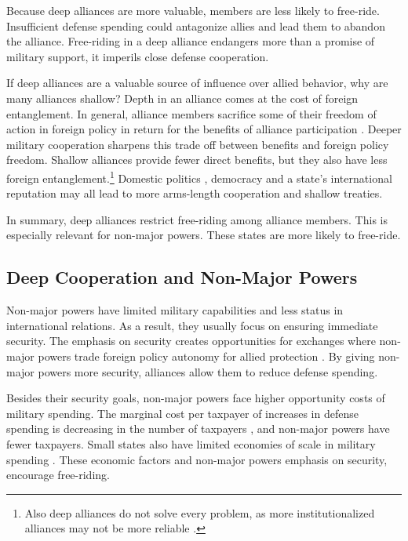 \documentclass[12pt]{article}
\begin{document}
Because deep alliances are more valuable, members are less likely to free-ride. 
Insufficient defense spending could antagonize allies and lead them to abandon the alliance. 
Free-riding in a deep alliance endangers more than a promise of military support, it imperils close defense cooperation. 


If deep alliances are a valuable source of influence over allied behavior, why are many alliances shallow? 
Depth in an alliance comes at the cost of foreign entanglement. 
In general, alliance members sacrifice some of their freedom of action in foreign policy in return for the benefits of alliance participation \citep{Altfield1984, Snyder1997}.
Deeper military cooperation sharpens this trade off between benefits and foreign policy freedom. 
Shallow alliances provide fewer direct benefits, but they also have less foreign entanglement.\footnote{Also deep alliances do not solve every problem, as more institutionalized alliances may not be more reliable \citep{LeedsAnac2005}.}
Domestic politics \citep{Davis2004}, democracy \citep{Chibaetal2015} and a state's international reputation \citep{Mattes2012} may all lead to more arms-length cooperation and shallow treaties. 


In summary, deep alliances restrict free-riding among alliance members. 
This is especially relevant for non-major powers.
These states are more likely to free-ride. 


\subsection{Deep Cooperation and Non-Major Powers} 


Non-major powers have limited military capabilities and less status in international relations. 
As a result, they usually focus on ensuring immediate security.  
The emphasis on security creates opportunities for exchanges where non-major powers trade foreign policy autonomy for allied protection \citep{Altfield1984, Morrow1991}. 
By giving non-major powers more security, alliances allow them to reduce defense spending. 


Besides their security goals, non-major powers face higher opportunity costs of military spending. 
The marginal cost per taxpayer of increases in defense spending is decreasing in the number of taxpayers \citep{DudleyMontmarquette1981}, and non-major powers have fewer taxpayers. 
Small states also have limited economies of scale in military spending \citep{Moravcsik1991, Kapstein1991, Anderton1995, Devore2013}.
These economic factors and non-major powers emphasis on security, encourage free-riding.  
\end{document}
